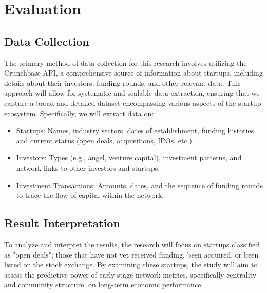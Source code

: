 \documentclass[a4paper,11pt]{article}
\begin{document}
\section{Evaluation}
\subsection{Data Collection}
The primary method of data collection for this research involves utilizing the Crunchbase API, a comprehensive source of information about startups, including details about their investors, funding rounds, and other relevant data. This approach will allow for systematic and scalable data extraction, ensuring that we capture a broad and detailed dataset encompassing various aspects of the startup ecosystem. Specifically, we will extract data on:
\begin{itemize}
    \item Startups: Names, industry sectors, dates of establishment, funding histories, and current status (open deals, acquisitions, IPOs, etc.).
    \item Investors: Types (e.g., angel, venture capital), investment patterns, and network links to other investors and startups.
    \item Investment Transactions: Amounts, dates, and the sequence of funding rounds to trace the flow of capital within the network.
\end{itemize}

\subsection{Result Interpretation}
To analyze and interpret the results, the research will focus on startups classified as "open deals"; those that have not yet received funding, been acquired, or been listed on the stock exchange. By examining these startups, the study will aim to assess the predictive power of early-stage network metrics, specifically centrality and community structure, on long-term economic performance.
\end{document}
